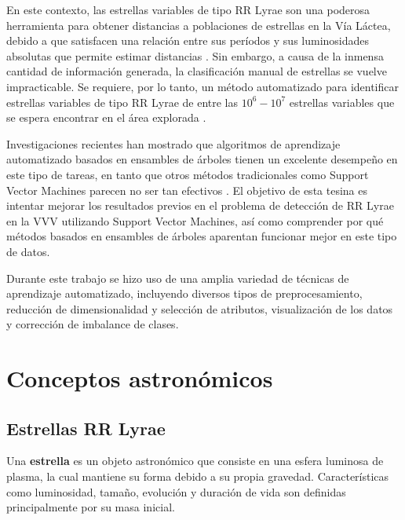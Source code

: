 \par En este contexto, las estrellas variables de tipo RR Lyrae son una poderosa herramienta para obtener distancias a poblaciones de estrellas en la Vía Láctea, debido a que satisfacen una relación entre sus períodos y sus luminosidades absolutas que permite estimar distancias \cite{Shapley} \cite{Baade}. Sin embargo, a causa de la inmensa cantidad de información generada, la clasificación manual de estrellas se vuelve impracticable. Se requiere, por lo tanto, un método automatizado para identificar estrellas variables de tipo RR Lyrae de entre las $10^6-10^7$ estrellas variables que se espera encontrar en el área explorada \cite{jbc}. \\

\par Investigaciones recientes han mostrado que algoritmos de aprendizaje automatizado basados en ensambles de árboles tienen un excelente desempeño en este tipo de tareas, en tanto que otros métodos tradicionales como Support Vector Machines parecen no ser tan efectivos \cite{elorrieta} \cite{jbc}. El objetivo de esta tesina es intentar mejorar los resultados previos en el problema de detección de RR Lyrae en la VVV utilizando Support Vector Machines, así como comprender por qué métodos basados en ensambles de árboles aparentan funcionar mejor en este tipo de datos.  \\

\par Durante este trabajo se hizo uso de una amplia variedad de técnicas de aprendizaje automatizado, incluyendo diversos tipos de preprocesamiento, reducción de dimensionalidad y selección de atributos, visualización de los datos y corrección de imbalance de clases. 

\section {Conceptos astronómicos}

\subsection{Estrellas RR Lyrae}

\par Una \textbf{estrella} es un objeto astronómico que consiste en una esfera luminosa de plasma, la cual mantiene su forma debido a su propia gravedad. Características como luminosidad, tamaño, evolución y duración de vida son definidas principalmente por su masa inicial. \\

